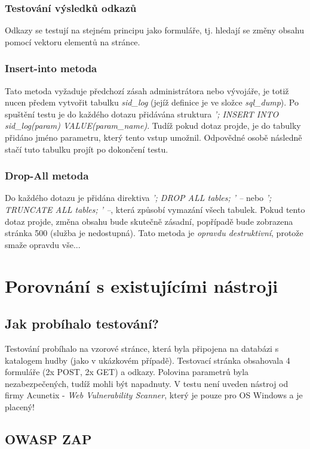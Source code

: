\documentclass[12pt, a4paper]{report}
\begin{document}
\subsection{Testování výsledků odkazů}
Odkazy se testují na stejném principu jako formuláře, tj. hledají se změny obsahu pomocí vektoru elementů na stránce.

\subsection{Insert-into metoda}
Tato metoda vyžaduje předchozí zásah administrátora nebo vývojáře, je totiž nucen předem vytvořit tabulku \textit{sid\_log} (jejíž definice je ve složce \textit{sql\_dump}). Po spuštění testu je do každého dotazu přidávána struktura \textit{'; INSERT INTO sid\_log(param) VALUE(param\_name)}. Tudíž pokud dotaz projde, je do tabulky přidáno jméno parametru, který tento vstup umožnil. Odpovědné osobě následně stačí tuto tabulku projít po dokončení testu.

\subsection{Drop-All metoda}
Do každého dotazu je přidána direktiva \textit{'; DROP ALL tables; ' --} nebo \textit{'; TRUNCATE ALL tables; ' --}, která způsobí vymazání všech tabulek. Pokud tento dotaz projde, změna obsahu bude skutečně zásadní, popřípadě bude zobrazena stránka 500 (služba je nedostupná). Tato metoda je \textit{opravdu destruktivní}, protože smaže opravdu vše...


\chapter{Porovnání s existujícími nástroji}
\section{Jak probíhalo testování?}
Testování probíhalo na vzorové stránce, která byla připojena na databázi s katalogem hudby (jako v ukázkovém případě). Testovací stránka obsahovala 4 formuláře (2x POST, 2x GET) a odkazy. Polovina parametrů byla nezabezpečených, tudíž mohli být napadnuty. V testu není uveden nástroj od firmy Acunetix - \textit{Web Vulnerability Scanner}, který je pouze pro OS Windows a je placený!

\section{OWASP ZAP}
\end{document}
